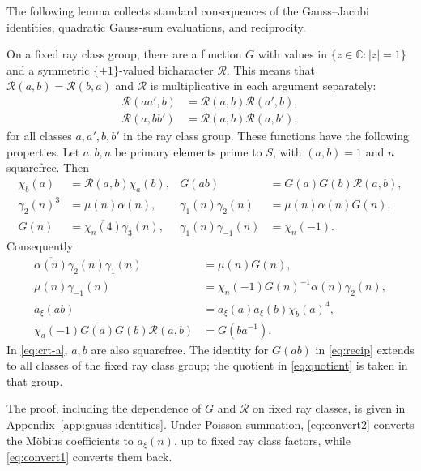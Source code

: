 The following lemma collects standard consequences of the Gauss--Jacobi
identities, quadratic Gauss-sum evaluations, and reciprocity.

\begin{lemma}\label{lem:arithmetic}
On a fixed ray class group, there are a function $G$ with values in
$\{z\in\mathbb C:|z|=1\}$ and a symmetric $\{\pm1\}$-valued
bicharacter $\mathcal R$. This means that $\mathcal R(a,b)=\mathcal R(b,a)$ and $\mathcal R$ is
multiplicative in each argument separately:
\[
 \begin{aligned}
 \mathcal R(aa',b)&=\mathcal R(a,b)\mathcal R(a',b),\\
 \mathcal R(a,bb')&=\mathcal R(a,b)\mathcal R(a,b'),
 \end{aligned}
\]
for all classes $a,a',b,b'$ in the ray class group.
These functions have the following properties.
Let $a,b,n$ be primary elements prime to $S$, with $(a,b)=1$ and
$n$ squarefree. Then
\begin{align}
 \chi_b(a)&=\mathcal R(a,b)\chi_a(b),&
 G(ab)&=G(a)G(b)\mathcal R(a,b),                                      \label{eq:recip}\\
 \gamma_2(n)^3&=\mu(n)\alpha(n),&
 \gamma_1(n)\gamma_2(n)&=\mu(n)\alpha(n)G(n),                 \label{eq:gj}\\
 G(n)&=\overline{\chi_n(4)}\gamma_3(n),&
 \gamma_1(n)\gamma_{-1}(n)&=\chi_n(-1).                     \label{eq:g}
\end{align}
Consequently
\begin{align}
 \overline{\alpha(n)}\gamma_2(n)\gamma_1(n)&=\mu(n)G(n),\label{eq:convert1}\\
 \mu(n)\gamma_{-1}(n)
 &=\chi_n(-1)G(n)^{-1}\overline{\alpha(n)}\gamma_2(n),\label{eq:convert2}\\
 a_\xi(ab)&=a_\xi(a)a_\xi(b)\chi_b(a)^4,                     \label{eq:crt-a}\\
 \chi_a(-1)\overline{G(a)}G(b)\mathcal R(a,b)&=G(ba^{-1}).            \label{eq:quotient}
\end{align}
In \eqref{eq:crt-a}, $a,b$ are also squarefree.
The identity for $G(ab)$ in \eqref{eq:recip} extends to all classes of the fixed ray class
group; the quotient in \eqref{eq:quotient} is taken in that group.
\end{lemma}
The proof, including the dependence of $G$ and $\mathcal R$ on fixed ray
classes, is given in Appendix~\ref{app:gauss-identities}.
Under Poisson summation, \eqref{eq:convert2} converts the M\"obius
coefficients to $a_\xi(n)$, up to fixed ray class factors, while
\eqref{eq:convert1} converts them back.

